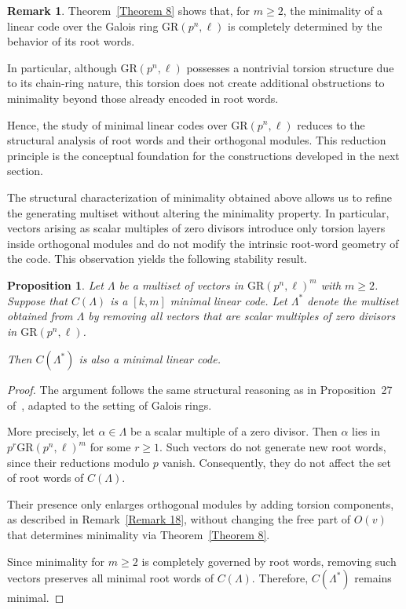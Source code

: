 \documentclass[10pt]{article}
\newtheorem{prop}[lem]{Proposition}
\theoremstyle{definition}
\newtheorem{remark}[lem]{Remark}
\begin{document}
\begin{remark}
Theorem~\ref{Theorem 8} shows that, for $m \ge 2$, the minimality of a linear code over the Galois ring $\mathrm{GR}(p^{n},\ell)$ is completely determined by the behavior of its root words.

In particular, although $\mathrm{GR}(p^{n},\ell)$ possesses a nontrivial torsion structure due to its chain-ring nature, this torsion does not create additional obstructions to minimality beyond those already encoded in root words.

Hence, the study of minimal linear codes over $\mathrm{GR}(p^{n},\ell)$ reduces to the structural analysis of root words and their orthogonal modules.
This reduction principle is the conceptual foundation for the constructions developed in the next section.
\end{remark}

\medskip

The structural characterization of minimality obtained above allows us to refine the generating multiset without altering the minimality property.
In particular, vectors arising as scalar multiples of zero divisors introduce only torsion layers inside orthogonal modules and do not modify the intrinsic root-word geometry of the code.
This observation yields the following stability result.
\begin{prop}\label{Proposition 23}
Let $\Lambda$ be a multiset of vectors in $\mathrm{GR}(p^{n},\ell)^{m}$ with $m \ge 2$.
Suppose that $C(\Lambda)$ is a $[k,m]$ minimal linear code.
Let $\Lambda^{*}$ denote the multiset obtained from $\Lambda$ by removing all vectors that are scalar multiples of zero divisors in $\mathrm{GR}(p^{n},\ell)$.

Then $C(\Lambda^{*})$ is also a minimal linear code.
\end{prop}

\begin{proof}
The argument follows the same structural reasoning as in Proposition~27 of~\cite{ChatterjeeMesnager}, adapted to the setting of Galois rings.

More precisely, let $\alpha \in \Lambda$ be a scalar multiple of a zero divisor.
Then $\alpha$ lies in $p^{r}\mathrm{GR}(p^{n},\ell)^{m}$ for some $r \ge 1$.
Such vectors do not generate new root words, since their reductions modulo $p$ vanish.
Consequently, they do not affect the set of root words of $C(\Lambda)$.

Their presence only enlarges orthogonal modules by adding torsion components,
as described in Remark~\ref{Remark 18},
without changing the free part of $O(v)$ that determines minimality via Theorem~\ref{Theorem 8}.

Since minimality for $m \ge 2$ is completely governed by root words,
removing such vectors preserves all minimal root words of $C(\Lambda)$.
Therefore, $C(\Lambda^{*})$ remains minimal.
\end{proof}
\end{document}
